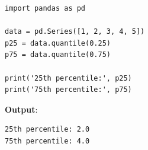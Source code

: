 \begin{vidu}[title={Pandas Series}]
\begin{lstlisting}
import pandas as pd

data = pd.Series([1, 2, 3, 4, 5])
p25 = data.quantile(0.25)
p75 = data.quantile(0.75)

print('25th percentile:', p25)
print('75th percentile:', p75)
\end{lstlisting}

\textbf{Output}:
\begin{lstlisting}
25th percentile: 2.0
75th percentile: 4.0
\end{lstlisting}
\end{vidu}
